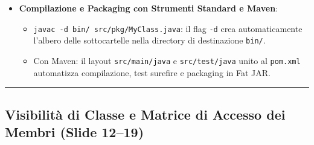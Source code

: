 \documentclass[11pt,a4paper,oneside]{report}
\newcommand{\passthrough}[1]{#1}
\providecommand{\tightlist}{\setlength{\itemsep}{0pt}\setlength{\parskip}{0pt}}
\begin{document}
\begin{itemize}
  \begin{itemize}
  \tightlist
  \item
    Se un file \passthrough{\lstinline!.java!} omette la dichiarazione
    \passthrough{\lstinline!package!}, la classe appartiene al package
    predefinito senza nome.
  \item
    \textbf{Limitazione critica}: Le classi nel default package
    \textbf{non possono essere importate né utilizzate} da classi
    situate in package con nome. Nel software professionale e agli esami
    il suo uso è fortemente scoraggiato.
  \end{itemize}
\item
  \textbf{Compilazione e Packaging con Strumenti Standard e Maven}:

  \begin{itemize}
  \tightlist
  \item
    \passthrough{\lstinline!javac -d bin/ src/pkg/MyClass.java!}: il
    flag \passthrough{\lstinline!-d!} crea automaticamente l'albero
    delle sottocartelle nella directory di destinazione
    \passthrough{\lstinline!bin/!}.
  \item
    Con Maven: il layout \passthrough{\lstinline!src/main/java!} e
    \passthrough{\lstinline!src/test/java!} unito al
    \passthrough{\lstinline!pom.xml!} automatizza compilazione, test
    surefire e packaging in Fat JAR.
  \end{itemize}
\end{itemize}

\begin{center}\rule{0.5\linewidth}{0.5pt}\end{center}

\subsection{Visibilità di Classe e Matrice di Accesso dei Membri (Slide
12--19)}\label{chap10_visibilituxe0-di-classe-e-matrice-di-accesso-dei-membri-slide-1219}
\end{document}
